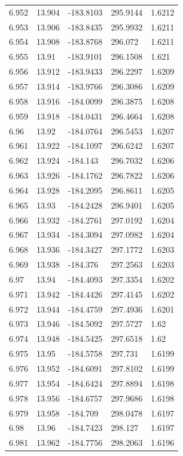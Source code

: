 \begin{tabular}{lllll}
6.952 & 13.904 & -183.8103 & 295.9144 & 1.6212 \\
6.953 & 13.906 & -183.8435 & 295.9932 & 1.6211 \\
6.954 & 13.908 & -183.8768 & 296.072 & 1.6211 \\
6.955 & 13.91 & -183.9101 & 296.1508 & 1.621 \\
6.956 & 13.912 & -183.9433 & 296.2297 & 1.6209 \\
6.957 & 13.914 & -183.9766 & 296.3086 & 1.6209 \\
6.958 & 13.916 & -184.0099 & 296.3875 & 1.6208 \\
6.959 & 13.918 & -184.0431 & 296.4664 & 1.6208 \\
6.96 & 13.92 & -184.0764 & 296.5453 & 1.6207 \\
6.961 & 13.922 & -184.1097 & 296.6242 & 1.6207 \\
6.962 & 13.924 & -184.143 & 296.7032 & 1.6206 \\
6.963 & 13.926 & -184.1762 & 296.7822 & 1.6206 \\
6.964 & 13.928 & -184.2095 & 296.8611 & 1.6205 \\
6.965 & 13.93 & -184.2428 & 296.9401 & 1.6205 \\
6.966 & 13.932 & -184.2761 & 297.0192 & 1.6204 \\
6.967 & 13.934 & -184.3094 & 297.0982 & 1.6204 \\
6.968 & 13.936 & -184.3427 & 297.1772 & 1.6203 \\
6.969 & 13.938 & -184.376 & 297.2563 & 1.6203 \\
6.97 & 13.94 & -184.4093 & 297.3354 & 1.6202 \\
6.971 & 13.942 & -184.4426 & 297.4145 & 1.6202 \\
6.972 & 13.944 & -184.4759 & 297.4936 & 1.6201 \\
6.973 & 13.946 & -184.5092 & 297.5727 & 1.62 \\
6.974 & 13.948 & -184.5425 & 297.6518 & 1.62 \\
6.975 & 13.95 & -184.5758 & 297.731 & 1.6199 \\
6.976 & 13.952 & -184.6091 & 297.8102 & 1.6199 \\
6.977 & 13.954 & -184.6424 & 297.8894 & 1.6198 \\
6.978 & 13.956 & -184.6757 & 297.9686 & 1.6198 \\
6.979 & 13.958 & -184.709 & 298.0478 & 1.6197 \\
6.98 & 13.96 & -184.7423 & 298.127 & 1.6197 \\
6.981 & 13.962 & -184.7756 & 298.2063 & 1.6196 \\

\end{tabular}
